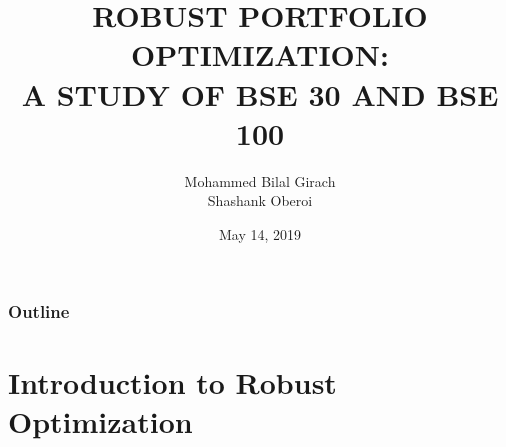 \documentclass{beamer}
\title[ROBUST PORTFOLIO OPTIMIZATION]{ROBUST PORTFOLIO OPTIMIZATION:\\
A STUDY OF BSE 30 AND BSE 100} %
\author{Mohammed Bilal Girach \\ Shashank Oberoi} %
\institute[]{
Department of Mathematics \\ %
\medskip
IIT Guwahati
}
\date{May 14, 2019}
\begin{document}
\begin{frame}
\titlepage %
\end{frame}

\begin{frame}
\frametitle{Outline} %
\tableofcontents %
\end{frame}


\section{Introduction to Robust Optimization} %

\end{document}
